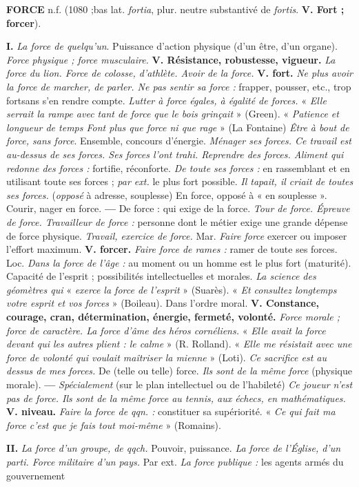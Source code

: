 {\bf FORCE} {\sf n.f.} (1080 ;bas lat. {\it fortia}, plur. neutre substantivé de {\it fortis}. {\bf V. Fort ; forcer}).

{\bf I.} {\it La force de quelqu'un}.  Puissance d'action physique (d'un être, d'un organe). {\it Force physique ; force musculaire.} {\bf V. Résistance, robustesse, vigueur.} {\it La force du lion. Force de colosse, d'athlète. Avoir de la force.} {\bf V. fort.} {\it Ne plus avoir la force de marcher, de parler. Ne pas sentir sa force :} frapper, pousser, etc., trop fortsans s'en rendre compte. {\it Lutter à force égales, à égalité de forces.} « {\it Elle serrait la rampe avec tant de force que le bois grinçait} » ({\sc Green}). « {\it Patience et longueur de temps Font plus que force ni que rage} » ({\sc La Fontaine}) {\it Être à bout de force, sans force}.  Ensemble, concours d'énergie. {\it Ménager ses forces. Ce travail est au-dessus de ses forces. Ses forces l'ont trahi. Reprendre des forces. Aliment qui redonne des forces :} fortifie, réconforte. {\it De toute ses forces :} en rassemblant et en utilisant toute ses forces ; {\it par ext.} le plus fort possible. {\it Il tapait, il criait de toutes ses forces.} \lb ({\it opposé} à adresse, souplesse) {\sc En force}, opposé à « en souplesse ». Courir, nager en force. {\bf —} {\sc De force} : qui exige de la force. {\it Tour de force. Épreuve de force. Travailleur de force :} personne dont le métier exige une grande dépense de force physique. {\it Travail, exercice de force.} \lb Mar. {\it Faire force} exercer ou imposer l'effort maximum. {\bf V. forcer.} {\it Faire force de rames :} ramer de toute ses forces. \lb Loc. {\it Dans la force de l'âge :} au moment ou un homme est le plus fort (maturité).  Capacité de l'esprit ; possibilités intellectuelles et morales. {\it La science des géomètres qui } « {\it exerce la force de l'esprit} » ({\sc Suarès}). « {\it Et consultez longtemps votre esprit et vos forces} » ({\sc Boileau}). Dans l'ordre moral. {\bf V. Constance, courage, cran, détermination, énergie, fermeté, volonté.} {\it Force morale ; force de caractère. La force d'âme des héros cornéliens.} « {\it Elle avait la force devant qui les autres plient : le calme} » ({\sc R. Rolland}). « {\it Elle me résistait avec une force de volonté qui voulait maîtriser la mienne} » ({\sc Loti}). {\it Ce sacrifice est au dessus de mes forces.}   {\sc De} (telle ou telle) {\sc force.} {\it Ils sont de la même force} (physique morale). {\bf —} {\it Spécialement} (sur le plan intellectuel ou de l'habileté) {\it Ce joueur n'est pas de force. Ils sont de la même force au tennis, aux échecs, en mathématiques.} {\bf V. niveau.}  {\it Faire la force de qqn. :} constituer sa supériorité. « {\it Ce qui fait ma force c'est que je fais tout moi-même} » ({\sc Romains}).

{\bf II.} {\it La force d'un groupe, de qqch.}  Pouvoir, puissance. {\it La force de l'Église, d'un parti. Force militaire d'un pays.} Par ext. {\it La force publique :} les agents armés du gouvernement


